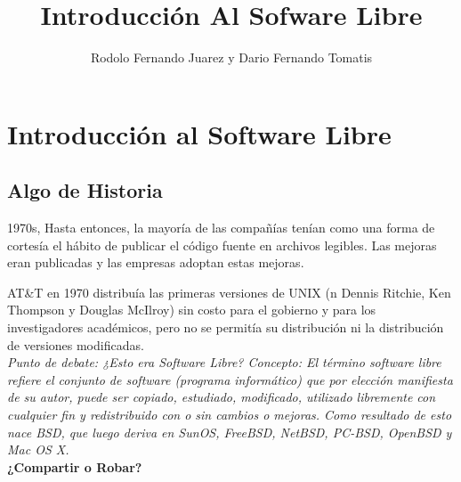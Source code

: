 \documentclass{book}
\title{Introducción Al Sofware Libre}
\author{Rodolo Fernando Juarez y Dario Fernando Tomatis}
\begin{document}
\maketitle
\section{Introducción al Software Libre}
\subsection{Algo de Historia}

1970s,
Hasta entonces, la mayoría de las compañías tenían como una forma de cortesía el
hábito de publicar el código fuente en archivos legibles. Las mejoras eran publicadas y las empresas adoptan estas mejoras.

AT\&T en 1970 distribuía las primeras versiones de UNIX (n Dennis Ritchie, Ken Thompson y Douglas McIlroy) sin costo para el gobierno y para los investigadores académicos, pero no se permitía su distribución ni la distribución de versiones modificadas. 
\\
{\it 
Punto de debate: ¿Esto era Software Libre?
Concepto:
El término software libre refiere el conjunto de software (programa informático) que por elección manifiesta de su autor, puede ser copiado, estudiado, modificado, utilizado libremente con cualquier fin y redistribuido con o sin cambios o mejoras.
Como resultado de esto nace BSD, que luego deriva en SunOS, FreeBSD, NetBSD, PC-BSD, OpenBSD y Mac OS X.
}
\\
{\bf ¿Compartir o Robar?}
\end{document}
